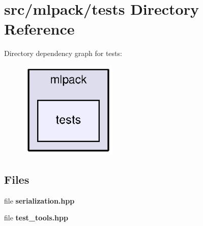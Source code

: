\section{src/mlpack/tests Directory Reference}
\label{dir_203a7f8a9efb7258e4ba143ee61c484d}
Directory dependency graph for tests\+:
\nopagebreak
\begin{figure}[H]
\begin{center}
\leavevmode
\includegraphics[width=130pt]{dir_203a7f8a9efb7258e4ba143ee61c484d_dep}
\end{center}
\end{figure}
\subsection*{Files}
\begin{DoxyCompactItemize}
\item 
file {\bf serialization.\+hpp}
\item 
file {\bf test\+\_\+tools.\+hpp}
\end{DoxyCompactItemize}
